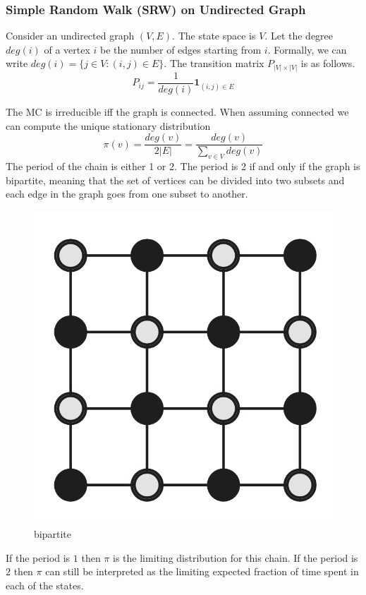 \documentclass[11pt,a4paper]{article}
\begin{document}
\subsubsection{Simple Random Walk (SRW) on Undirected Graph}
Consider an undirected graph $(V,E)$. The state space is $V$. Let the degree $deg(i)$ of a vertex $i$ be the number of edges starting from $i$. Formally, we can write $deg(i) = \{j \in V : (i, j) \in E\}$. The transition matrix $P_{|V|\times|V|}$ is as follows. $$P_{ij}=\frac{1}{deg(i)}\mathbf{1}_{(i,j)\in E}$$

The MC is irreducible iff the graph is connected. When assuming connected we can compute the unique stationary distribution $$\pi(v)=\frac{deg(v)}{2|E|}=\frac{deg(v)}{\sum_{v\in V}deg(v)}$$
The period of the chain is either 1 or 2. The period is 2 if and only if the graph is bipartite, meaning that the set of vertices can be divided into two subsets and each edge in the graph goes from one subset to another.
\begin{center}\begin{figure}[htbp]
    \centering
    \includegraphics[scale=0.15]{bipartite.png}
    \caption{bipartite}
    \label{}
\end{figure}\end{center}
If the period is $1$ then $\pi$ is the limiting distribution for this chain. If the period is $2$ then $\pi$ can still be interpreted as the limiting expected fraction of time spent in each of the states.
\end{document}
